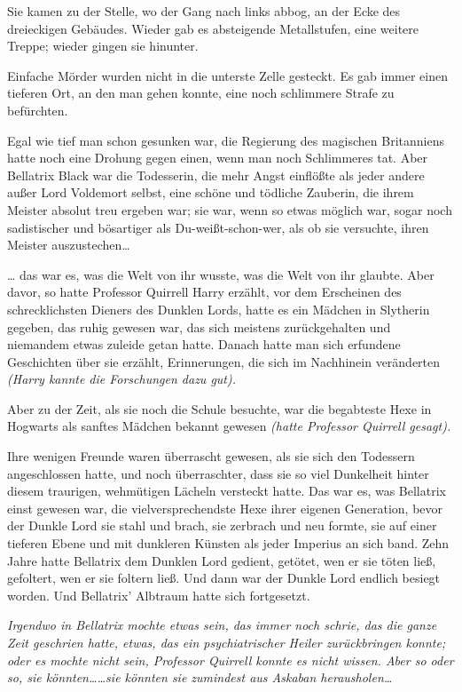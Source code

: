 {Sie kamen zu der Stelle, wo der Gang nach links abbog, an der Ecke des dreieckigen Gebäudes. Wieder gab es absteigende Metallstufen, eine weitere Treppe; wieder gingen sie hinunter.

Einfache Mörder wurden nicht in die unterste Zelle gesteckt. Es gab immer einen tieferen Ort, an den man gehen konnte, eine noch schlimmere Strafe zu befürchten.

Egal wie tief man schon gesunken war, die Regierung des magischen Britanniens hatte noch eine Drohung gegen einen, wenn man noch Schlimmeres tat. Aber Bellatrix Black war die Todesserin, die mehr Angst einflößte als jeder andere außer Lord Voldemort selbst, eine schöne und tödliche Zauberin, die ihrem Meister absolut treu ergeben war; sie war, wenn so etwas möglich war, sogar noch sadistischer und bösartiger als Du-weißt-schon-wer, als ob sie versuchte, ihren Meister auszustechen…

… das war es, was die Welt von ihr wusste, was die Welt von ihr glaubte. Aber davor, so hatte Professor Quirrell Harry erzählt, vor dem Erscheinen des schrecklichsten Dieners des Dunklen Lords, hatte es ein Mädchen in Slytherin gegeben, das ruhig gewesen war, das sich meistens zurückgehalten und niemandem etwas zuleide getan hatte. Danach hatte man sich erfundene Geschichten über sie erzählt, Erinnerungen, die sich im Nachhinein veränderten \emph{(Harry kannte die Forschungen dazu gut).}

Aber zu der Zeit, als sie noch die Schule besuchte, war die begabteste Hexe in Hogwarts als sanftes Mädchen bekannt gewesen \emph{(hatte Professor Quirrell gesagt).}

Ihre wenigen Freunde waren überrascht gewesen, als sie sich den Todessern angeschlossen hatte, und noch überraschter, dass sie so viel Dunkelheit hinter diesem traurigen, wehmütigen Lächeln versteckt hatte. Das war es, was Bellatrix einst gewesen war, die vielversprechendste Hexe ihrer eigenen Generation, bevor der Dunkle Lord sie stahl und brach, sie zerbrach und neu formte, sie auf einer tieferen Ebene und mit dunkleren Künsten als jeder Imperius an sich band. Zehn Jahre hatte Bellatrix dem Dunklen Lord gedient, getötet, wen er sie töten ließ, gefoltert, wen er sie foltern ließ. Und dann war der Dunkle Lord endlich besiegt worden. Und Bellatrix' Albtraum hatte sich fortgesetzt.

\emph{Irgendwo in Bellatrix mochte etwas sein, das immer noch schrie, das die ganze Zeit geschrien hatte, etwas, das ein psychiatrischer Heiler zurückbringen konnte; oder es mochte nicht sein, Professor Quirrell konnte es nicht wissen. Aber so oder so, sie könnten……sie könnten sie zumindest aus Askaban herausholen…}

}
